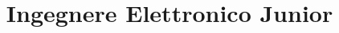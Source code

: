 \documentclass[10pt,a4paper,sans]{moderncv}
\title{Ingegnere Elettronico Junior}
\begin{document}
  \makecvtitle

  
  
  
  

  \pagebreak

  
  
  
\end{document}
